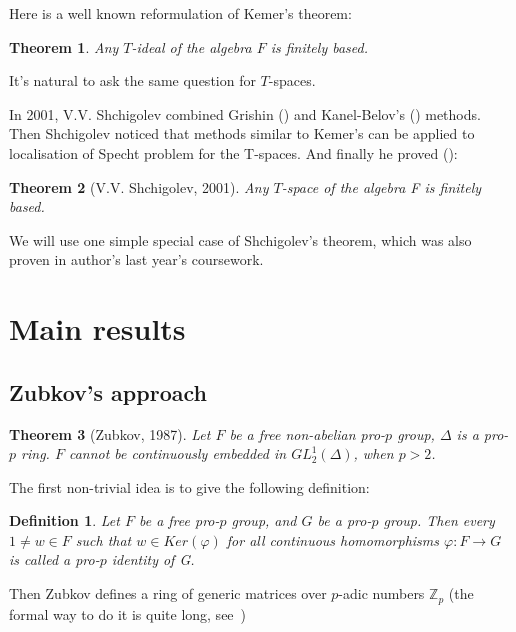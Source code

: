 \documentclass[12pt,a4paper]{article}
\newtheorem*{theorem*}{Theorem}
\newtheorem{definition}{Definition}[subsection]
\begin{document}
    Here is a well known reformulation of Kemer's theorem:

    \vskip 0.1in\noindent
    \begin{theorem*}
        Any $T$-ideal of the algebra $F$ is finitely based.
    \end{theorem*}
    \vskip 0.1in\noindent

    It's natural to ask the same question for $T$-spaces.

    In 2001, V.V. Shchigolev combined Grishin (\cite{Grishin}) and Kanel-Belov's (\cite{Kanel}) methods.
    Then Shchigolev noticed that methods similar to Kemer's can be applied to localisation of Specht problem for the T-spaces.
    And finally he proved (\cite{Shchigolev}):

    \vskip 0.1in\noindent
    \begin{theorem*} [V.V. Shchigolev, 2001]
        Any $T$-space of the algebra F is finitely based.
    \end{theorem*}
    \vskip 0.1in\noindent

    We will use one simple special case of Shchigolev's theorem, which was also proven in author's last year's coursework.


    \section{Main results}

    \subsection{Zubkov's approach}

    \begin{theorem*}[Zubkov, 1987]
        Let $F$ be a free non-abelian pro-$p$ group, $\Delta$ is a pro-$p$ ring.
        $F$ cannot be continuously embedded in $GL^1_2(\Delta)$, when $p>2$.
    \end{theorem*}
    \vskip 0.1in\noindent

    The first non-trivial idea is to give the following definition:
    \vskip 0.1in\noindent
    \begin{definition}
        Let $F$ be a free pro-$p$ group, and $G$ be a pro-$p$ group.
        Then every $1\neq w\in F$ such that $w\in Ker(\varphi)$ for all continuous homomorphisms $\varphi: F\to G$ is called a pro-$p$ identity of G.
    \end{definition}
    \vskip 0.1in\noindent
    Then Zubkov defines a ring of generic matrices over $p$-adic numbers $\mathbb{Z}_p$ (the formal way to do it is quite long, see~\cite{Zubkov})
\end{document}
